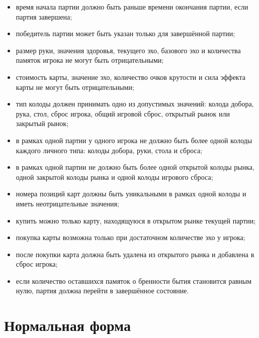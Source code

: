 \begin{itemize}

	\item время начала партии должно быть раньше времени окончания партии,
	      если
	      партия завершена;

	\item победитель партии может быть указан только для завершённой
	      партии;

	\item размер руки, значения здоровья, текущего эхо, базового эхо и
	      количества памяток игрока не могут быть отрицательными;

	\item стоимость карты, значение эхо, количество очков крутости и сила
	      эффекта карты не могут быть отрицательными;

	\item тип колоды должен принимать одно из допустимых значений: колода
	      добора, рука, стол, сброс игрока, общий игровой сброс, открытый
	      рынок
	      или
	      закрытый рынок;

	\item в рамках одной партии у одного игрока не должно быть более одной
	      колоды каждого личного типа: колоды добора, руки, стола и сброса;

	\item в рамках одной партии не должно быть более одной открытой колоды
	      рынка, одной закрытой колоды рынка и одной колоды игрового
	      сброса;

	\item номера позиций карт должны быть уникальными в рамках одной колоды
	      и
	      иметь неотрицательные значения;

	\item купить можно только карту, находящуюся в открытом рынке текущей
	      партии;

	\item покупка карты возможна только при достаточном количестве эхо у
	      игрока;

	\item после покупки карта должна быть удалена из открытого рынка и
	      добавлена в сброс игрока;

	\item если количество оставшихся памяток о бренности бытия становится
	      равным нулю, партия должна перейти в завершённое состояние.

\end{itemize}
\section{Нормальная форма}


